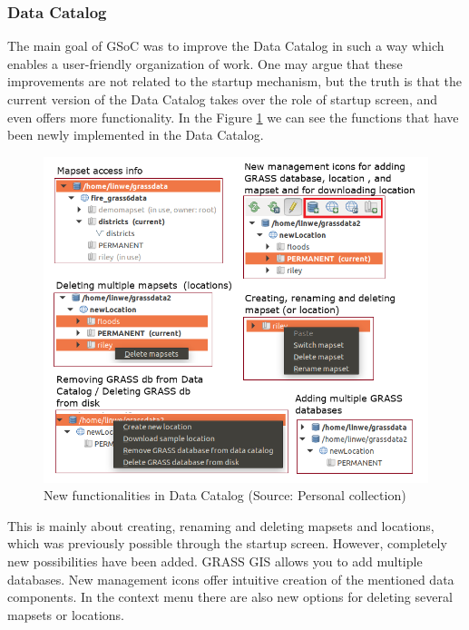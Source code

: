\documentclass[a4paper,10pt,twoside]{article}
\begin{document}
\newpage
\vspace*{-1cm}
\subsubsection{Data Catalog}

The main goal of GSoC was to improve the Data Catalog in such a way which enables a user-friendly organization of work. One may argue that these improvements are not related to the startup mechanism, but the truth is that the current version of the Data Catalog takes over the role of startup screen, and even offers more functionality. In the Figure \ref{fig:function} we can see the functions that have been newly implemented in the Data Catalog.

\vspace{0.3cm}
\begin{figure}[hbt!] 
\begin{center}
\includegraphics[width=15cm]{../pictures/funkce.png} 
\caption[New functionalities in Data Catalog ]{New functionalities in Data Catalog (Source: Personal collection)}
\label{fig:function}
\end{center}
\end{figure}

\noindent This is mainly about creating, renaming and deleting mapsets and locations, which was previously possible through the startup screen. However, completely new possibilities have been added. GRASS GIS allows you to add multiple databases. New management icons offer intuitive creation of the mentioned data components. In the context menu there are also new options for deleting several mapsets or locations.
\end{document}
